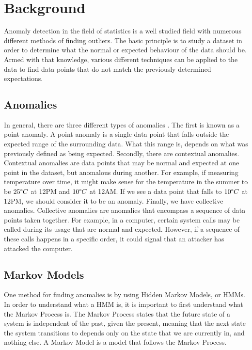 \documentclass[letterpaper, 11pt]{article}%
\begin{document}
\section{Background}
Anomaly detection in the field of statistics is a well studied field with numerous different methods of finding outliers. The basic principle is to study a dataset in order to determine what the normal or expected behaviour of the data should be. Armed with that knowledge, various different techniques can be applied to the data to find data points that do not match the previously determined expectations.

\subsection{Anomalies}
In general, there are three different types of anomalies \cite{zahra}. The first is known as a point anomaly. A point anomaly is a single data point that falls outside the expected range of the surrounding data. What this range is, depends on what was previously defined as being expected. Secondly, there are contextual anomalies. Contextual anomalies are data points that may be normal and expected at one point in the dataset, but anomalous during another. For example, if measuring temperature over time, it might make sense for the temperature in the summer to be $25 \degree C$ at 12PM and $10 \degree C$ at 12AM. If we see a data point that falls to $10 \degree C$ at 12PM, we should consider it to be an anomaly. Finally, we have collective anomalies. Collective anomalies are anomalies that encompass a sequence of data points taken together. For example, in a computer, certain system calls may be called during its usage that are normal and expected. However, if a sequence of these calls happens in a specific order, it could signal that an attacker has attacked the computer\cite{chandola}.

\subsection{Markov Models}
One method for finding anomalies is by using Hidden Markov Models, or HMMs. In order to understand what a HMM is, it is important to first understand what the Markov Process is. The Markov Process states that the future state of a system is independent of the past, given the present, meaning that the next state the system transitions to depends only on the state that we are currently in, and nothing else. A Markov Model is a model that follows the Markov Process.
\end{document}
